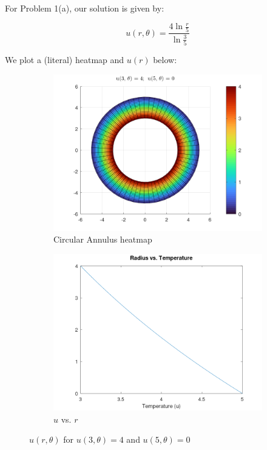 


\cfoot{}

For Problem 1(a), our solution is given by:

$$
u(r, \theta) = \frac{4 \ln{\frac{r}{5}}}{\ln{\frac{3}{5}}}
$$

We plot a (literal) heatmap and $u(r)$ below: 
\begin{figure}[h]
    \centering
    \begin{subfigure}[b]{0.475\textwidth}
        \centering
        \includegraphics[width=\textwidth]{problem_1a_heatmap.png}
        \caption{Circular Annulus heatmap}
    \end{subfigure}
    \hfill
    \begin{subfigure}[b]{0.475\textwidth}
        \centering
        \includegraphics[width=\textwidth]{problem_1a_u_vs_r.png}
        \caption{$u$ vs. $r$}
    \end{subfigure}
    \caption[]{$u(r, \theta)$ for $u(3, \theta) = 4$ and $u(5, \theta) = 0$}
\end{figure}

